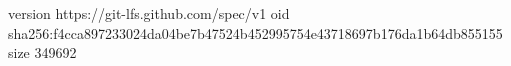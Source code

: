 version https://git-lfs.github.com/spec/v1
oid sha256:f4cca897233024da04be7b47524b452995754e43718697b176da1b64db855155
size 349692
